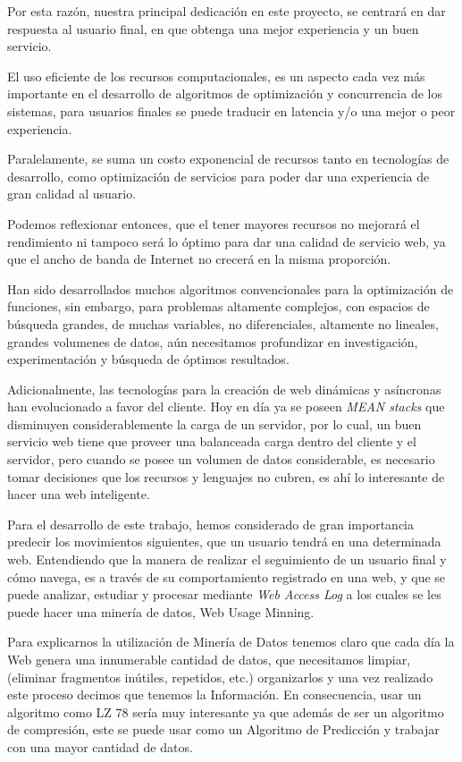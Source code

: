   Por esta razón, nuestra principal dedicación en este proyecto, se centrará en dar respuesta al usuario final, en que obtenga una mejor experiencia y un buen servicio.
  
  El uso eficiente de los recursos computacionales, es un aspecto cada vez más importante en el desarrollo de algoritmos de optimización y concurrencia de los sistemas,  para usuarios finales se puede traducir en latencia y/o una mejor o peor experiencia. 
  
  Paralelamente, se suma un costo exponencial de recursos tanto en tecnologías de desarrollo, como optimización de servicios  para poder dar una experiencia de gran calidad al usuario.
  
  Podemos reflexionar entonces, que el tener mayores recursos no mejorará el rendimiento ni tampoco será lo óptimo para dar una calidad de servicio web, ya que el ancho de banda de Internet no crecerá en la misma proporción.
  
  Han sido desarrollados muchos algoritmos convencionales para la optimización de funciones, sin embargo, para problemas altamente complejos, con espacios de búsqueda grandes, de muchas variables, no diferenciales,  altamente no lineales, grandes volumenes de datos, aún necesitamos profundizar en investigación, experimentación y búsqueda de óptimos resultados.
   
  Adicionalmente, las tecnologías para la creación de web dinámicas y asíncronas han evolucionado a favor del cliente.
  Hoy en día ya se poseen \emph{MEAN stacks} que disminuyen considerablemente la carga de un servidor, por lo cual, un buen servicio web tiene que proveer una balanceada carga dentro del cliente y el servidor, pero cuando se posee un volumen de datos considerable, es necesario tomar decisiones que los recursos y lenguajes no cubren, es ahí lo interesante  de hacer una web inteligente.

  Para el desarrollo de este trabajo, hemos considerado de gran importancia predecir los movimientos siguientes, que un usuario tendrá en una determinada web.
  Entendiendo que la manera de realizar el seguimiento de un usuario final y cómo navega, es a través de su comportamiento registrado en una web, y que se puede analizar, estudiar y procesar mediante \emph{Web Access Log}  a los cuales se les puede hacer una minería de datos, Web Usage Minning. 
  
  Para explicarnos la utilización de Minería de Datos tenemos claro que cada día la Web genera una innumerable cantidad de datos, que necesitamos limpiar, (eliminar fragmentos inútiles, repetidos, etc.) organizarlos y una vez realizado este proceso decimos que tenemos la Información. 
  En consecuencia, usar un algoritmo como LZ 78 sería muy interesante ya que además de ser un algoritmo de compresión, este se puede usar como un Algoritmo de Predicción y trabajar con una mayor cantidad de datos.
  
